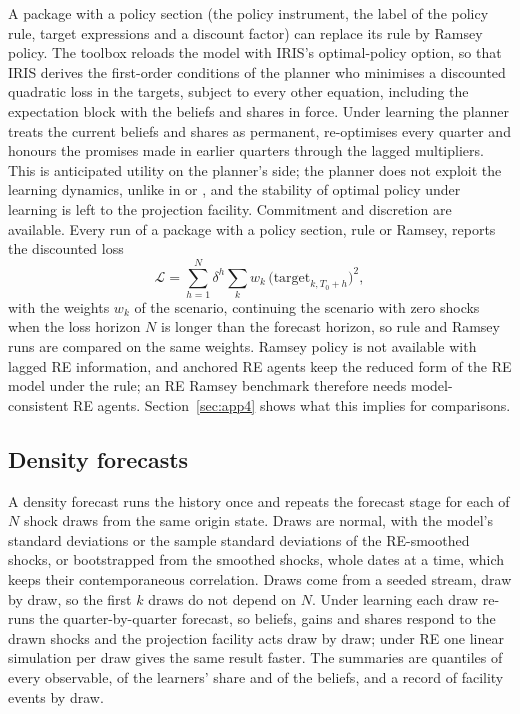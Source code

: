 \documentclass[pdflatex,sn-basic]{sn-jnl}
\begin{document}
A package with a policy section (the policy instrument, the label of the policy rule, target
expressions and a discount factor) can replace its rule by Ramsey policy. The toolbox reloads the
model with IRIS's optimal-policy option, so that IRIS derives the first-order conditions of the
planner who minimises a discounted quadratic loss in the targets, subject to every other equation,
including the expectation block with the beliefs and shares in force. Under learning the planner
treats the current beliefs and shares as permanent, re-optimises every quarter and honours the
promises made in earlier quarters through the lagged multipliers. This is anticipated utility on
the planner's side; the planner does not exploit the learning dynamics, unlike in
\citet{gaspar2006} or \citet{molnar2014}, and the stability of optimal policy under learning
\citep{evans2003} is left to the projection facility. Commitment and discretion are available. Every run of a
package with a policy section, rule or Ramsey, reports the discounted loss
\begin{equation}\label{eq:loss}
  \mathcal{L} = \sum_{h=1}^{N}\delta^h\sum_k w_k\,\bigl(\text{target}_{k,T_0+h}\bigr)^2,
\end{equation}
with the weights $w_k$ of the scenario, continuing the scenario with zero shocks when the loss
horizon $N$ is longer than the forecast horizon, so rule and Ramsey runs are compared on the same
weights. Ramsey policy is not available with lagged RE information, and anchored RE agents keep the
reduced form of the RE model under the rule; an RE Ramsey benchmark therefore needs
model-consistent RE agents. Section~\ref{sec:app4} shows what this implies for comparisons.

\subsection{Density forecasts}\label{sec:density}

A density forecast runs the history once and repeats the forecast stage for each of $N$ shock
draws from the same origin state. Draws are normal, with the model's standard deviations or the
sample standard deviations of the RE-smoothed shocks, or bootstrapped from the smoothed shocks,
whole dates at a time, which keeps their contemporaneous correlation. Draws come from a seeded
stream, draw by draw, so the first $k$ draws do not depend on $N$. Under learning each draw re-runs
the quarter-by-quarter forecast, so beliefs, gains and shares respond to the drawn shocks and the
projection facility acts draw by draw; under RE one linear simulation per draw gives the same
result faster. The summaries are quantiles of every observable, of the learners' share and of the
beliefs, and a record of facility events by draw.
\end{document}
